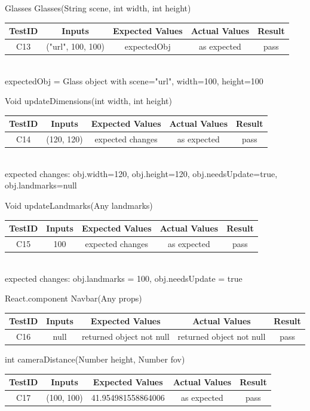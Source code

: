\documentclass[12pt, oneside, openany, titlepage]{article}
\begin{document}
Glasses Glasses(String scene, int width, int height) \\
\begin{tabular}{ |c|c|c|c|c| } 
 \hline
 TestID & Inputs & Expected Values & Actual Values & Result \\ 
 \hline
 C13 & ("url", 100, 100) & expectedObj & as expected & pass \\ 
 \hline
\end{tabular}
\\
expectedObj = Glass object with scene="url", width=100, height=100

Void updateDimensions(int width, int height)\\
\begin{tabular}{ |c|c|c|c|c| } 
 \hline
 TestID & Inputs & Expected Values & Actual Values & Result \\ 
 \hline
 C14 & (120, 120) & expected changes & as expected & pass \\ 
 \hline
\end{tabular}
\\
expected changes: obj.width=120, obj.height=120, obj.needsUpdate=true, obj.landmarks=null

Void updateLandmarks(Any landmarks)\\
\begin{tabular}{ |c|c|c|c|c| } 
 \hline
 TestID & Inputs & Expected Values & Actual Values & Result \\ 
 \hline
 C15 & 100 & expected changes & as expected & pass \\ 
 \hline
\end{tabular}
\\
expected changes: obj.landmarks = 100, obj.needsUpdate = true

React.component Navbar(Any props) \\
\begin{tabular}{ |c|c|c|c|c| } 
 \hline
 TestID & Inputs & Expected Values & Actual Values & Result \\ 
 \hline
 C16 & null & returned object not null & returned object not null & pass \\ 
 \hline
\end{tabular}

int cameraDistance(Number height, Number fov) \\
\begin{tabular}{ |c|c|c|c|c| } 
 \hline
 TestID & Inputs & Expected Values & Actual Values & Result \\ 
 \hline
 C17 & (100, 100) & 41.954981558864006 & as expected & pass \\ 
 \hline
\end{tabular}
\end{document}

